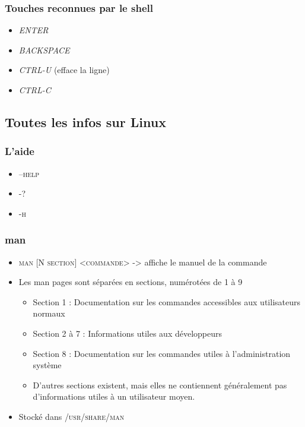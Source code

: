 \documentclass[a4paper]{article}
\begin{document}
    \subsubsection{Touches reconnues par le shell}
    \begin{itemize}[label=\textbullet, font=\Large]
      \item \emph{ENTER}
      \item \emph{BACKSPACE}
      \item \emph{CTRL-U} (efface la ligne)
      \item \emph{CTRL-C}
    \end{itemize}
    \subsection{Toutes les infos sur Linux}
    \subsubsection{L'aide}
    \begin{itemize}[label=\textbullet, font=\Large]
      \item \textsc{--help}
      \item \textsc{-?}
      \item \textsc{-h}
    \end{itemize}
    \subsubsection{man}
    \begin{itemize}[label=\textbullet, font=\Large]
      \item \textsc{man [N}\degres \textsc{ section] <commande>} -> affiche le manuel de la commande
      \item Les man pages sont séparées en sections, numérotées de 1 à 9
      \begin{itemize}[label=, font=\scriptsize]
        \item Section 1 : Documentation sur les commandes accessibles aux utilisateurs normaux
        \item Section 2 à 7 : Informations utiles aux développeurs
        \item Section 8 : Documentation sur les commandes utiles à l'administration système
        \item D’autres sections existent, mais elles ne contiennent généralement pas d’informations utiles à un
        utilisateur moyen.
      \end{itemize}
      \item Stocké dans \textsc{/usr/share/man}
    \end{itemize}
\end{document}
